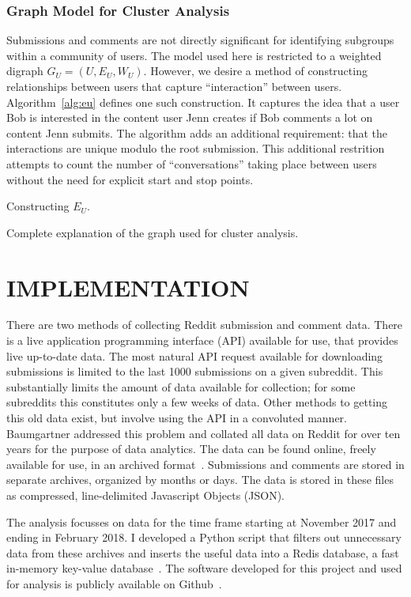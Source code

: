 \documentclass[letterpaper, 10 pt, conference]{ieeeconf}
\theoremstyle{definition}
\newcommand{\red}{\color{red}}
\begin{document}
\subsubsection{Graph Model for Cluster Analysis}
Submissions and comments are not directly significant for identifying subgroups within a community of users. The model used here is restricted to a weighted digraph \(G_U = (U, E_U, W_U).\) However, we desire a method of constructing relationships between users that capture ``interaction'' between users. Algorithm~\ref{alg:eu} defines one such construction. It captures the idea that a user Bob is interested in the content user Jenn creates if Bob comments a lot on content Jenn submits. The algorithm adds an additional requirement: that the interactions are unique modulo the root submission. This additional restrition attempts to count the number of ``conversations'' taking place between users without the need for explicit start and stop points.
\begin{algorithm}
  \caption{Constructing \(E_U.\)}
  \label{alg:eu}
\end{algorithm}
{\red Complete explanation of the graph used for cluster analysis.}

\section{IMPLEMENTATION}
There are two methods of collecting Reddit submission and comment data. There is a live application programming interface (API) available for use, that provides live up-to-date data. The most natural API request available for downloading submissions is limited to the last 1000 submissions on a given subreddit. This substantially limits the amount of data available for collection; for some subreddits this constitutes only a few weeks of data. Other methods to getting this old data exist, but involve using the API in a convoluted manner. Baumgartner addressed this problem and collated all data on Reddit for over ten years for the purpose of data analytics. The data can be found online, freely available for use, in an archived format~\cite{Software:RedditArchive}. Submissions and comments are stored in separate archives, organized by months or days. The data is stored in these files as compressed, line-delimited Javascript Objects (JSON).

The analysis focusses on data for the time frame starting at November 2017 and ending in February 2018. I developed a Python script that filters out unnecessary data from these archives and inserts the useful data into a Redis database, a fast in-memory key-value database~\cite{Software:Redis}. The software developed for this project and used for analysis is publicly available on Github~\cite{Software:Mine}.
\end{document}
